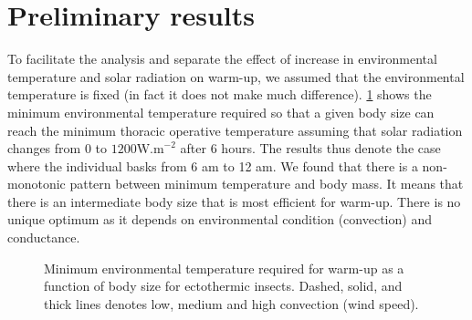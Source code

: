 \documentclass[12pt]{article}
\begin{document}
\section*{Preliminary results}
To facilitate the analysis and separate the effect of increase in environmental temperature and solar radiation on warm-up, we assumed that the environmental temperature is fixed (in fact it does not make much difference). 
\cref{fig:warmup} shows the minimum environmental temperature required so that a given body size can reach the minimum thoracic operative temperature assuming that solar radiation changes from 0 to $1200 \mbox{W.m}^{-2}$ after 6 hours.
The results thus denote the case where the individual basks from 6 am to 12 am.
We found that there is a non-monotonic pattern between minimum temperature and body mass.
It means that there is an intermediate body size that is most efficient for warm-up.
There is no unique optimum as it depends on environmental condition (convection) and conductance. 
 
\begin{figure}
\begin{center}
	\caption{Minimum environmental temperature required for warm-up as a function of body size for ectothermic insects.
	Dashed, solid, and thick lines denotes low, medium and high convection (wind speed).  
	}
	\label{fig:warmup}
\end{center}
\end{figure}


\end{document}
